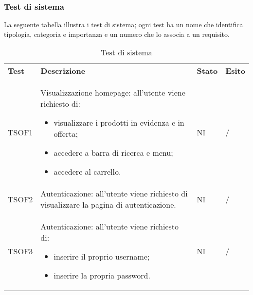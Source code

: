 \subsubsection{Test di sistema}
La seguente tabella illustra i test di sistema; ogni test ha un nome che identifica tipologia, categoria e importanza e un numero che lo associa a un requisito.
\begin{center}
    \centering
    \renewcommand{\arraystretch}{1.8}
    \label{tab:TestSistema}
    \begin{longtable}[!h]{p{60px} p{240px} p{35px} p{35px}}
        \caption{Test di sistema}                                                                                                                                                                                                           \\
        \rowcolor{logo!70} \textbf{Test} & \textbf{Descrizione}                                                                                                                                                & \textbf{Stato} & \textbf{Esito} \\
        TSOF1                            & Visualizzazione homepage: all'utente viene richiesto di: \begin{itemize} \item visualizzare i prodotti in evidenza e in offerta; \item accedere a barra di ricerca e menu; \item accedere al carrello. \end{itemize}                                                                                  & NI             & /             \\
        TSOF2                            & Autenticazione: all'utente viene richiesto di visualizzare la pagina di autenticazione.                                                                             & NI             & /             \\
        TSOF3                            & Autenticazione: all'utente viene richiesto di: \begin{itemize} \item inserire il proprio username; \item inserire la propria password. \end{itemize}                                                                                            & NI             & /             \\

\end{longtable}
\end{center}
